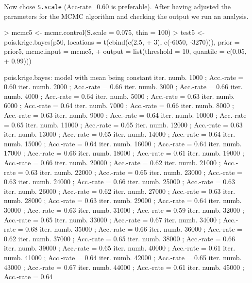 \documentclass[12pt,a4paper]{article}
\newcommand{\code}[1]{\texttt{\small #1}}
\begin{document}
Now chose \code{S.scale} (Acc-rate=0.60 is preferable).  
After having adjusted the parameters for the MCMC algorithm and checking the output we run an analysis.
\begin{Schunk}
\begin{Sinput}
> mcmc5 <- mcmc.control(S.scale = 0.075, thin = 100)
> test5 <- pois.krige.bayes(p50, locations = t(cbind(c(2.5, 
+     3), c(-6050, -3270))), prior = prior5, mcmc.input = mcmc5, 
+     output = list(threshold = 10, quantile = c(0.05, 
+         0.99)))
\end{Sinput}
\end{Schunk}
\begin{Schunk}
\begin{Soutput}
pois.krige.bayes: model with mean being constant
iter. numb. 1000 ; Acc.-rate = 0.60 
iter. numb. 2000 ; Acc.-rate = 0.66 
iter. numb. 3000 ; Acc.-rate = 0.66 
iter. numb. 4000 ; Acc.-rate = 0.64 
iter. numb. 5000 ; Acc.-rate = 0.63 
iter. numb. 6000 ; Acc.-rate = 0.64 
iter. numb. 7000 ; Acc.-rate = 0.66 
iter. numb. 8000 ; Acc.-rate = 0.63 
iter. numb. 9000 ; Acc.-rate = 0.64 
iter. numb. 10000 ; Acc.-rate = 0.65 
iter. numb. 11000 ; Acc.-rate = 0.65 
iter. numb. 12000 ; Acc.-rate = 0.63 
iter. numb. 13000 ; Acc.-rate = 0.65 
iter. numb. 14000 ; Acc.-rate = 0.64 
iter. numb. 15000 ; Acc.-rate = 0.64 
iter. numb. 16000 ; Acc.-rate = 0.64 
iter. numb. 17000 ; Acc.-rate = 0.66 
iter. numb. 18000 ; Acc.-rate = 0.61 
iter. numb. 19000 ; Acc.-rate = 0.66 
iter. numb. 20000 ; Acc.-rate = 0.62 
iter. numb. 21000 ; Acc.-rate = 0.63 
iter. numb. 22000 ; Acc.-rate = 0.65 
iter. numb. 23000 ; Acc.-rate = 0.63 
iter. numb. 24000 ; Acc.-rate = 0.66 
iter. numb. 25000 ; Acc.-rate = 0.63 
iter. numb. 26000 ; Acc.-rate = 0.62 
iter. numb. 27000 ; Acc.-rate = 0.63 
iter. numb. 28000 ; Acc.-rate = 0.63 
iter. numb. 29000 ; Acc.-rate = 0.64 
iter. numb. 30000 ; Acc.-rate = 0.63 
iter. numb. 31000 ; Acc.-rate = 0.59 
iter. numb. 32000 ; Acc.-rate = 0.65 
iter. numb. 33000 ; Acc.-rate = 0.67 
iter. numb. 34000 ; Acc.-rate = 0.68 
iter. numb. 35000 ; Acc.-rate = 0.66 
iter. numb. 36000 ; Acc.-rate = 0.62 
iter. numb. 37000 ; Acc.-rate = 0.65 
iter. numb. 38000 ; Acc.-rate = 0.66 
iter. numb. 39000 ; Acc.-rate = 0.65 
iter. numb. 40000 ; Acc.-rate = 0.61 
iter. numb. 41000 ; Acc.-rate = 0.64 
iter. numb. 42000 ; Acc.-rate = 0.65 
iter. numb. 43000 ; Acc.-rate = 0.67 
iter. numb. 44000 ; Acc.-rate = 0.61 
iter. numb. 45000 ; Acc.-rate = 0.64 

\end{Soutput}
\end{Schunk}
\end{document}
